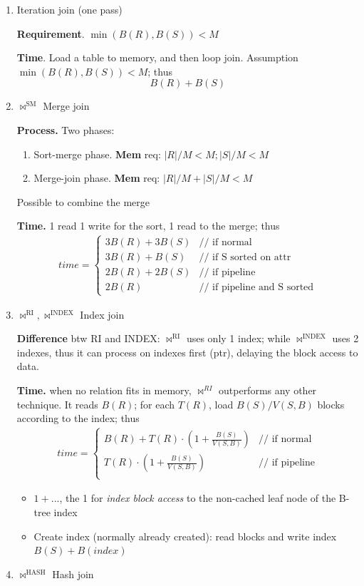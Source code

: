 \documentclass[a4paper]{report}
\begin{document}
\begin{enumerate}
\item Iteration join (one pass)

\textbf{Requirement}. $\min(B(R), B(S)) < M$

\textbf{Time}. Load a table to memory, and then loop join. Assumption $\min(B(R), B(S))<M$; thus
$$B(R)+B(S)$$
\item $\bowtie^\text{SM}$ Merge join 

\textbf{Process.} Two phases:
\begin{enumerate}
\item Sort-merge phase. \textbf{Mem} req: $|R|/M<M; |S|/M<M$
\item Merge-join phase. \textbf{Mem} req: $|R|/M+|S|/M <M$
\end{enumerate}
Possible to combine the merge 

\textbf{Time.} 1 read 1 write for the sort, 1 read to the merge; thus 
\begin{eqnarray*}
time = \left\{ \begin{array}{rl}
  3B(R)+3B(S) &\text{// if normal} \\
  3B(R)+B(S) &\text{// if S sorted on attr} \\
  2B(R)+2B(S) &\text{// if pipeline}\\
  2B(R) &\text{// if pipeline and S sorted}
       \end{array} \right.
\end{eqnarray*}
\item $\bowtie^\text{RI}, \bowtie^\text{INDEX}$ Index join 

\textbf{Difference} btw RI and INDEX: $\bowtie^\text{RI}$ uses only 1 index; while $\bowtie^\text{INDEX}$ uses 2 indexes, thus it can process on indexes first (ptr), delaying the block access to data. 

\textbf{Time.} when no relation fits in memory, $\bowtie^{RI}$ outperforms any other technique. It reads $B(R)$; for each $T(R)$, load $B(S)/V(S, B)$ blocks according to the index; thus 
\begin{eqnarray*}
time = \left\{ \begin{array}{rl}
  B(R)+T(R)\cdot (1+\frac{B(S)}{V(S, B)}) &\text{// if normal} \\
  T(R)\cdot (1+\frac{B(S)}{V(S, B)}) &\text{// if pipeline}\\
       \end{array} \right.
\end{eqnarray*}

\begin{itemize}
\item $1+...$, the 1 for \textit{index block access} to the non-cached leaf node of the B-tree index 
\item Create index (normally already created): read blocks and write index $B(S)+B(index)$
\end{itemize}
\item $\bowtie^\text{HASH}$ Hash join 


\end{enumerate}
\end{document}
